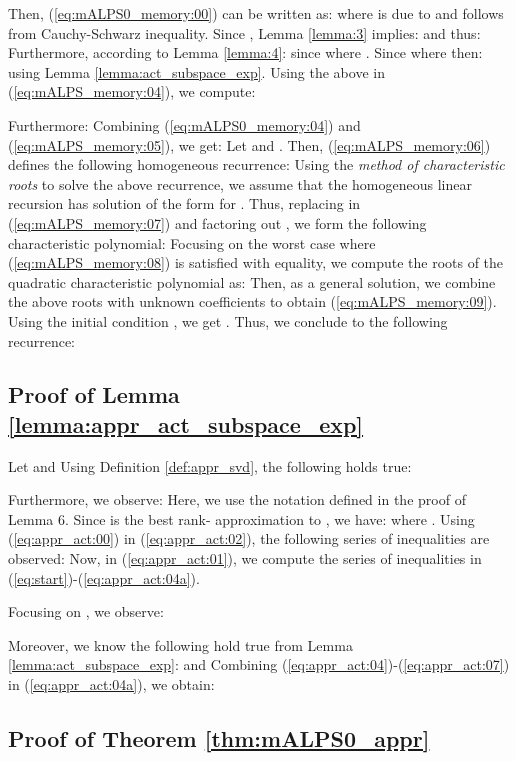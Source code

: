 \documentclass[twocolumn]{svjour3}
\begin{document}
Then, (\ref{eq:mALPS0_memory:00}) can be written as:
 where  is due to  and  follows from Cauchy-Schwarz inequality. 
Since , Lemma \ref{lemma:3} implies:
 and thus:
 Furthermore, according to Lemma \ref{lemma:4}:
 since  where . Since  where 
 then:
 using Lemma \ref{lemma:act_subspace_exp}. Using the above in (\ref{eq:mALPS_memory:04}), we compute:


Furthermore:
 Combining (\ref{eq:mALPS0_memory:04}) and (\ref{eq:mALPS_memory:05}), we get:
 Let  and . Then, (\ref{eq:mALPS_memory:06}) defines the following homogeneous recurrence:
 Using the {\it method of characteristic roots} to solve the above recurrence, we assume that the homogeneous linear recursion has solution of the form  for . Thus, replacing  in (\ref{eq:mALPS_memory:07}) and factoring out , we form the following characteristic polynomial:
 Focusing on the worst case where (\ref{eq:mALPS_memory:08}) is satisfied with equality, we compute the roots  of the quadratic characteristic polynomial as:
 Then, as a general solution, we combine the above roots with unknown coefficients  to obtain (\ref{eq:mALPS_memory:09}).
Using the initial condition , we get . Thus, we conclude to the following recurrence:





\subsection{Proof of Lemma \ref{lemma:appr_act_subspace_exp}}

Let 
 and 
Using Definition \ref{def:appr_svd}, the following holds true:

Furthermore, we observe:
 Here, we use the notation defined in the proof of Lemma 6. Since  is the best rank- approximation to , we have:
 where . Using (\ref{eq:appr_act:00}) in (\ref{eq:appr_act:02}), the following series of inequalities are observed:
 Now, in (\ref{eq:appr_act:01}), we compute the series of inequalities in (\ref{eq:start})-(\ref{eq:appr_act:04a}).
\begin{figure*}[!htp]

\hrulefill
\end{figure*}
Focusing on , we observe:
 

Moreover, we know the following hold true from Lemma \ref{lemma:act_subspace_exp}:
 and
 Combining (\ref{eq:appr_act:04})-(\ref{eq:appr_act:07}) in (\ref{eq:appr_act:04a}), we obtain:


\subsection{Proof of Theorem \ref{thm:mALPS0_appr}}
\end{document}
